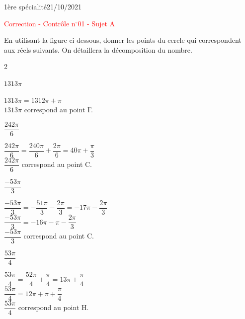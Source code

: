 \documentclass[a4paper,12pt]{article}        %
\begin{document}
\pagestyle{empty}
\vspace*{-1.5cm}
1ère spécialité\phantom{xxxxxxxxxxxxxxxxxxxxxxxxxxxxxxxxxxxxxxxxxxxxxxxxxxxxxxxxxxxxxxx}21/10/2021
{\begin{center}\Huge{\textcolor{red}{Correction - Contrôle n$^{\circ}$01 - Sujet A}}\end{center}}


En utilisant la figure ci-dessous, donner les points du cercle qui correspondent aux réels suivants. On détaillera la décomposition du nombre.
\begin{multicols}{2}
\begin{enumMet}
    \item $1313\pi$\\
    \begin{corrBox}
        $1313\pi=1312\pi+\pi$\\ 
        $1313\pi$ correspond au point I'.
    \end{corrBox}
    \item $\dfrac{242\pi}{6}$\\
    \begin{corrBox}
        $\dfrac{242\pi}{6}=\dfrac{240\pi}{6}+\dfrac{2\pi}{6}=40\pi+\dfrac{\pi}{3}$\\
        $\dfrac{242\pi}{6}$ correspond au point C.
    \end{corrBox}
    \columnbreak
    \item $\dfrac{-53\pi}{3}$\\
    \begin{corrBox}
        $\dfrac{-53\pi}{3}=-\dfrac{51\pi}{3}-\dfrac{2\pi}{3}=-17\pi-\dfrac{2\pi}{3}$\\
        $\dfrac{-53\pi}{3}=-16\pi-\pi-\dfrac{2\pi}{3}$\\
        $\dfrac{-53\pi}{3}$ correspond au point C.
    \end{corrBox}
    \item $\dfrac{53\pi}{4}$\\
    \begin{corrBox}
        $\dfrac{53\pi}{4}=\dfrac{52\pi}{4}+\dfrac{\pi}{4}=13\pi+\dfrac{\pi}{4}$\\
        $\dfrac{53\pi}{4}=12\pi+\pi+\dfrac{\pi}{4}$\\
        $\dfrac{53\pi}{4}$ correspond au point H.
    \end{corrBox}
    
\end{enumMet}
\end{multicols}
\end{document}
